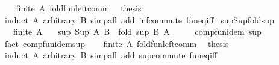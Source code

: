 \begin{isabellebody}
\ \ \isamarkupfalse%
\ {\isacartoucheopen}finite\ A{\isacartoucheclose}\ fold{\isacharunderscore}{\kern0pt}fun{\isacharunderscore}{\kern0pt}left{\isacharunderscore}{\kern0pt}comm\ \isamarkupfalse%
\ {\isacharquery}{\kern0pt}thesis\isanewline
\ \ \ \ \isamarkupfalse%
\ {\isacharparenleft}{\kern0pt}induct\ A\ arbitrary{\isacharcolon}{\kern0pt}\ B{\isacharparenright}{\kern0pt}\ {\isacharparenleft}{\kern0pt}simp{\isacharunderscore}{\kern0pt}all\ add{\isacharcolon}{\kern0pt}\ inf{\isacharunderscore}{\kern0pt}commute\ fun{\isacharunderscore}{\kern0pt}eq{\isacharunderscore}{\kern0pt}iff{\isacharparenright}{\kern0pt}\isanewline
{}\isamarkupfalse%
%
\endisatagproof
{\isafoldproof}%
%
\isadelimproof
\isanewline
%
\endisadelimproof
\isanewline
{}\isamarkupfalse%
\ sup{\isacharunderscore}{\kern0pt}Sup{\isacharunderscore}{\kern0pt}fold{\isacharunderscore}{\kern0pt}sup{\isacharcolon}{\kern0pt}\isanewline
\ \ \ {\isachardoublequoteopen}finite\ A{\isachardoublequoteclose}\isanewline
\ \ \ {\isachardoublequoteopen}sup\ {\isacharparenleft}{\kern0pt}Sup\ A{\isacharparenright}{\kern0pt}\ B\ {\isacharequal}{\kern0pt}\ fold\ sup\ B\ A{\isachardoublequoteclose}\isanewline
%
\isadelimproof
%
\endisadelimproof
%
\isatagproof
{}\isamarkupfalse%
\ {\isacharminus}{\kern0pt}\isanewline
\ \ \isamarkupfalse%
\ comp{\isacharunderscore}{\kern0pt}fun{\isacharunderscore}{\kern0pt}idem\ sup\isanewline
\ \ \ \ \isamarkupfalse%
\ {\isacharparenleft}{\kern0pt}fact\ comp{\isacharunderscore}{\kern0pt}fun{\isacharunderscore}{\kern0pt}idem{\isacharunderscore}{\kern0pt}sup{\isacharparenright}{\kern0pt}\isanewline
\ \ \isamarkupfalse%
\ {\isacartoucheopen}finite\ A{\isacartoucheclose}\ fold{\isacharunderscore}{\kern0pt}fun{\isacharunderscore}{\kern0pt}left{\isacharunderscore}{\kern0pt}comm\ \isamarkupfalse%
\ {\isacharquery}{\kern0pt}thesis\isanewline
\ \ \ \ \isamarkupfalse%
\ {\isacharparenleft}{\kern0pt}induct\ A\ arbitrary{\isacharcolon}{\kern0pt}\ B{\isacharparenright}{\kern0pt}\ {\isacharparenleft}{\kern0pt}simp{\isacharunderscore}{\kern0pt}all\ add{\isacharcolon}{\kern0pt}\ sup{\isacharunderscore}{\kern0pt}commute\ fun{\isacharunderscore}{\kern0pt}eq{\isacharunderscore}{\kern0pt}iff{\isacharparenright}{\kern0pt}\isanewline
{}\isamarkupfalse%
%
\endisatagproof
{\isafoldproof}%
%
\isadelimproof
\isanewline
%
\endisadelimproof
\isanewline
{}\isamarkupfalse%

\end{isabellebody}
